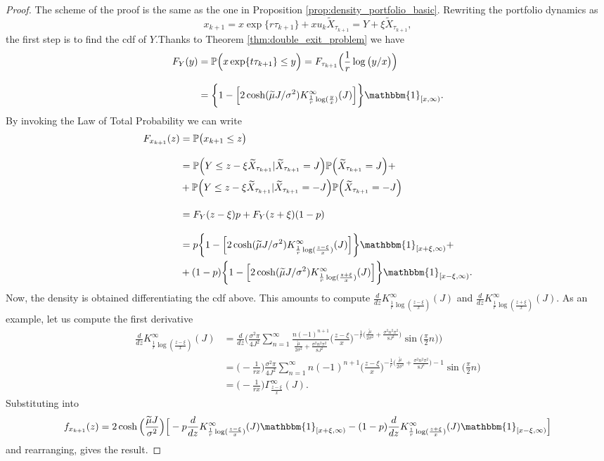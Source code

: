 \begin{proof}
	The scheme of the proof is the same as the one in Proposition \ref{prop:density_portfolio_basic}. Rewriting the portfolio dynamics as 
	\[ x_{k+1}=x\exp\{r\tau_{k+1}\}+xu_k\widetilde{X}_{\tau_{k+1}}=Y+\xi\widetilde{X}_{\tau_{k+1}}, \]
	the first step is to find the cdf of $Y$.Thanks to Theorem \ref{thm:double_exit_problem} we have
	\begin{align*}
	F_Y(y) & =\mathbb{P}\Big(x\exp\{t\tau_{k+1}\}\leq y\Big)= F_{\tau_{k+1}}\Big(\frac{1}{r}\log\big(y/x\big)\Big) \\[2ex]
	& = \bigg\{ 1-\Big[2\cosh(\widetilde{\mu}J/\sigma^2)K_{\frac{1}{r}\log(\frac{y}{x})}^{\infty}(J)  \Big]\bigg\}\mathbbm{1}_{[x,\infty)}.
	\end{align*}
	By invoking the Law of Total Probability we can write
	\begin{align*}
	F_{x_{k+1}}(z) & = \mathbb{P}\big(x_{k+1}\leq z\big) \\[2ex]
	& = \mathbb{P}\Big(Y\leq z-\xi\widetilde{X}_{\tau_{k+1}}\lvert\widetilde{X}_{\tau_{k+1}}=J\Big)\mathbb{P}\Big(\widetilde{X}_{\tau_{k+1}}=J\Big)+\\
	& + 
	\mathbb{P}\Big(Y\leq z-\xi\widetilde{X}_{\tau_{k+1}}\lvert\widetilde{X}_{\tau_{k+1}}=-J\Big)\mathbb{P}\Big(\widetilde{X}_{\tau_{k+1}}=-J\Big)\\[2ex]
	& = F_Y(z-\xi)p + F_Y(z+\xi)(1-p)\\[2ex]
	& = p\bigg\{ 1-\Big[2\cosh(\widetilde{\mu}J/\sigma^2)K_{\frac{1}{r}\log(\frac{z-\xi}{x})}^{\infty}(J)\Big]\bigg\}\mathbbm{1}_{[x+\xi,\infty)}+\\
	&+ (1-p)\bigg\{ 1-\Big[2\cosh(\widetilde{\mu}J/\sigma^2)K_{\frac{1}{r}\log(\frac{z+\xi}{x})}^{\infty}(J)\Big]\bigg\}\mathbbm{1}_{[x-\xi,\infty)}.
	\end{align*}
	Now, the density is obtained differentiating the cdf above. This amounts to compute $\frac{d}{dz}K_{\frac{1}{r}\log(\frac{z-\xi}{x})}^{\infty}(J)$ and $\frac{d}{dz}K_{\frac{1}{r}\log(\frac{z+\xi}{x})}^{\infty}(J)$. As an example, let us compute the first derivative
	\begin{align*}
	\frac{d}{dz}K_{\frac{1}{r}\log(\frac{z-\xi}{x})}^{\infty}(J) & = \frac{d}{dz}\bigg(\frac{\sigma^2\pi}{4J^2}\sum_{n=1}^{\infty}\frac{n(-1)^{n+1}}{\frac{\tilde{\mu}}{2\sigma^2} + \frac{\sigma^2n^2\pi^2}{8J^2}}\Big(\frac{z-\xi}{x}\Big)^{-\frac{1}{r}\big(\frac{\tilde{\mu}}{2\sigma^2} + \frac{\sigma^2n^2\pi^2}{8J^2}\big)}\sin\big(\frac{\pi}{2}n\big)  \bigg)\\[2ex]
	& = \big(-\frac{1}{rx}\big)\frac{\sigma^2\pi}{4J^2}\sum_{n=1}^{\infty}n(-1)^{n+1} \Big(\frac{z-\xi}{x}\Big)^{-\frac{1}{r}\big(\frac{\tilde{\mu}}{2\sigma^2} + \frac{\sigma^2n^2\pi^2}{8J^2}\big)-1}\sin\big(\frac{\pi}{2}n\big)\\[2ex]
	& = \big(-\frac{1}{rx}\big)\Gamma_{\frac{z-\xi}{x}}^{\infty}(J).
	\end{align*}
	Substituting into
	\[
	f_{x_{k+1}}(z) =2\cosh\Big(\frac{\widetilde{\mu}J}{\sigma^2}\Big)\Big[-p\frac{d}{dz}K_{\frac{1}{r}\log(\frac{z-\xi}{x})}^{\infty}(J)\mathbbm{1}_{[x+\xi,\infty)}-(1-p)\frac{d}{dz}K_{\frac{1}{r}\log(\frac{z+\xi}{x})}^{\infty}(J)\mathbbm{1}_{[x-\xi,\infty)}\Big]
	\]
	and rearranging, gives the result.
\end{proof}
